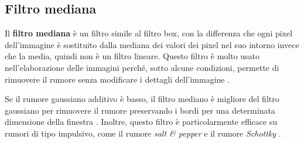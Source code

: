 \documentclass[../main.tex]{subfiles}
\begin{document}
\subsection{Filtro mediana}

Il \textbf{filtro mediana} è un filtro simile al filtro box, con la differenza che ogni pixel dell'immagine è sostituito dalla mediana dei valori dei pixel nel suo intorno invece che la media, quindi non è un filtro lineare. Questo filtro è molto usato nell'elaborazione delle immagini perché, sotto alcune condizioni, permette di rimuovere il rumore senza modificare i dettagli dell'immagine \cite{rezaee_2021}.

Se il rumore gaussiano additivo è basso, il filtro mediano è migliore del filtro gaussiano per rimuovere il rumore preservando i bordi per una determinata dimensione della finestra \cite{castro_2009}. Inoltre, questo filtro è particolarmente efficace su rumori di tipo impulsivo, come il rumore \textit{salt \& pepper} e il rumore \textit{Schottky} \cite{arce_2004}.\\
\end{document}
